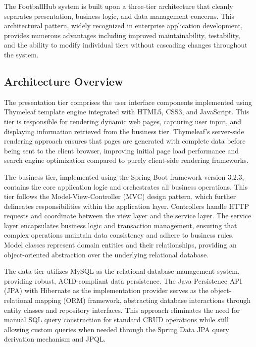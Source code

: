 The FootballHub system is built upon a three-tier architecture that cleanly separates presentation, business logic, and data management concerns. This architectural pattern, widely recognized in enterprise application development, provides numerous advantages including improved maintainability, testability, and the ability to modify individual tiers without cascading changes throughout the system.

\subsection{Architecture Overview}

The presentation tier comprises the user interface components implemented using Thymeleaf template engine integrated with HTML5, CSS3, and JavaScript. This tier is responsible for rendering dynamic web pages, capturing user input, and displaying information retrieved from the business tier. Thymeleaf's server-side rendering approach ensures that pages are generated with complete data before being sent to the client browser, improving initial page load performance and search engine optimization compared to purely client-side rendering frameworks.

The business tier, implemented using the Spring Boot framework version 3.2.3, contains the core application logic and orchestrates all business operations. This tier follows the Model-View-Controller (MVC) design pattern, which further delineates responsibilities within the application layer. Controllers handle HTTP requests and coordinate between the view layer and the service layer. The service layer encapsulates business logic and transaction management, ensuring that complex operations maintain data consistency and adhere to business rules. Model classes represent domain entities and their relationships, providing an object-oriented abstraction over the underlying relational database.

The data tier utilizes MySQL as the relational database management system, providing robust, ACID-compliant data persistence. The Java Persistence API (JPA) with Hibernate as the implementation provider serves as the object-relational mapping (ORM) framework, abstracting database interactions through entity classes and repository interfaces. This approach eliminates the need for manual SQL query construction for standard CRUD operations while still allowing custom queries when needed through the Spring Data JPA query derivation mechanism and JPQL.

